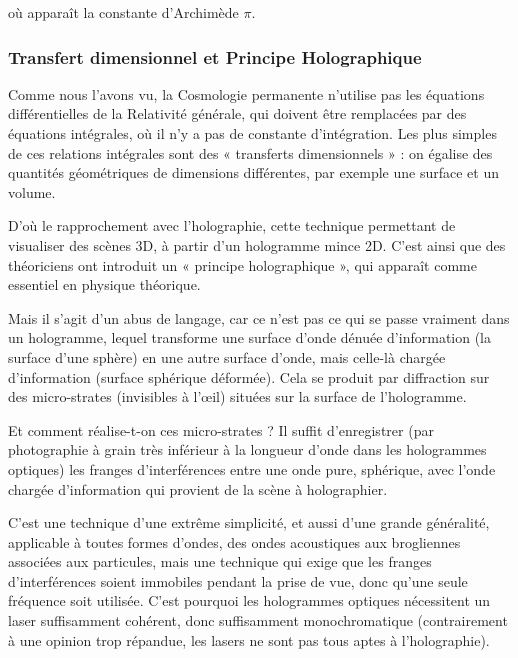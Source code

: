 \documentclass[a4paper,12pt]{article}
\begin{document}



où appara\^it la constante d'Archimède $\pi$.



\subsubsection{Transfert dimensionnel et Principe Holographique }
 
Comme nous l'avons vu, la Cosmologie permanente n'utilise pas les équations différentielles de la Relativité générale, qui doivent être remplacées par des équations intégrales, où il n'y a pas de constante d'intégration. Les plus simples de ces relations intégrales sont des « transferts dimensionnels » : on égalise des quantités géométriques de dimensions différentes, par exemple une surface et un volume.


D'où le rapprochement avec l'holographie, cette technique permettant de visualiser des scènes 3D, à partir d'un hologramme mince 2D. C'est ainsi que des théoriciens ont introduit un « principe holographique », qui apparaît comme essentiel en physique théorique.



Mais il s'agit d'un abus de langage, car ce n'est pas ce qui se passe vraiment dans un hologramme, lequel transforme une surface d'onde dénuée d'information (la surface d'une sphère) en une autre surface d'onde, mais celle-là chargée d'information (surface sphérique déformée). Cela se produit par diffraction sur des micro-strates (invisibles à l’œil) situées sur la surface de l'hologramme. 


Et comment réalise-t-on ces micro-strates ? Il suffit d'enregistrer (par photographie à grain très inférieur à la longueur d'onde dans les hologrammes optiques) les franges d'interférences entre une onde pure, sphérique, avec l'onde chargée d'information qui provient de la scène à holographier. 


C'est une technique d'une extrême simplicité, et aussi d'une grande généralité, applicable à toutes formes d'ondes, des ondes acoustiques aux brogliennes associées aux particules, mais une  technique qui exige que les franges d'interférences soient immobiles pendant la prise de vue, donc qu'une seule fréquence soit utilisée. C'est pourquoi les hologrammes optiques nécessitent un laser suffisamment cohérent, donc suffisamment monochromatique (contrairement à une opinion trop répandue, les lasers ne sont pas tous aptes à l'holographie).
\end{document}
